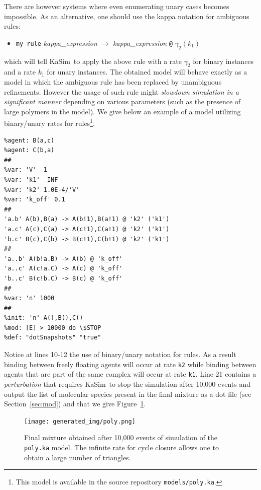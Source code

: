 \documentclass[11pt]{book}
\def\KaSim{\textsf{KaSim}}
\def\ttt#1{\texttt{#1}}
\def\rar{\rightarrow}
\def\ga{\gamma}
\def\ITE#1{\begin{itemize}#1\end{itemize}}
\begin{document}
There are however systems where even enumerating unary cases becomes impossible. As an alternative, one should use the kappa notation for ambiguous rules: 
\ITE{
\item[] \ttt{{\textquotesingle}my rule{\textquotesingle}} {\it kappa\_expression} $\rar$ {\it kappa\_expression} \ttt{@} $\ga_2(k_1)$  
}
which will tell \KaSim~to apply the above rule with a rate $\ga_2$ for binary instances and a rate $k_1$ for unary instances. The obtained model will behave exactly as a model in which the ambiguous rule has been replaced by unambiguous refinements. However the usage of such rule might \emph{slowdown simulation in a significant manner} depending on various parameters (such as the presence of large polymers in the model). We give below an example of a model utilizing binary/unary rates for rules\footnote{This model is available in the source repository \ttt{models/poly.ka}.}.

\begin{lstlisting}[language=kappa]
%agent: A(b,c)
%agent: B(a,c)
%agent: C(b,a)
##
%var: 'V'  1
%var: 'k1'  INF
%var: 'k2' 1.0E-4/'V' 
%var: 'k_off' 0.1
##
'a.b' A(b),B(a) -> A(b!1),B(a!1) @ 'k2' ('k1')
'a.c' A(c),C(a) -> A(c!1),C(a!1) @ 'k2' ('k1')
'b.c' B(c),C(b) -> B(c!1),C(b!1) @ 'k2' ('k1')
##
'a..b' A(b!a.B) -> A(b) @ 'k_off' 
'a..c' A(c!a.C) -> A(c) @ 'k_off'
'b..c' B(c!b.C) -> B(c) @ 'k_off' 
##
%var: 'n' 1000
##
%init: 'n' A(),B(),C()
%mod: [E] > 10000 do \$STOP 
%def: "dotSnapshots" "true"
\end{lstlisting}

Notice at lines 10-12 the use of binary/unary notation for rules. As a result binding between  freely floating agents will occur at rate \ttt{{\textquotesingle}k2{\textquotesingle}} while binding between agents that are part of the same complex will occur at rate \ttt{{\textquotesingle}k1{\textquotesingle}}. Line 21 contains a \emph{perturbation} that requires \KaSim~to stop the simulation after 10,000 events and output the list of molecular species present in the final mixture as a dot file (see Section~\ref{sec:mod}) and that we give Figure~\ref{fig:species}.

\begin{figure}[htbp]
\begin{center}
\texttt{[image: generated\_img/poly.png]}
\caption{Final mixture%
  obtained after 10,000 events of simulation of the \ttt{poly.ka} model. The infinite rate for cycle closure allows one to obtain a large number of triangles.}
\label{fig:species}
\end{center}
\end{figure}
\end{document}
